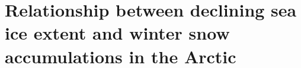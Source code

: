 
\chapter{Relationship between declining sea ice extent and winter snow accumulations in the Arctic}
\label{chap:winter_prec}

